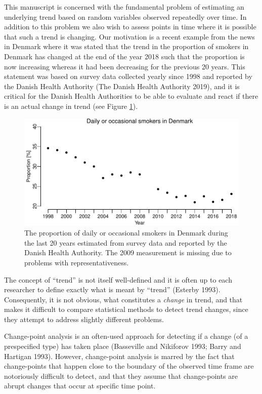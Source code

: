 \documentclass[11pt,]{article}
\theoremstyle{nonumberplain}
\begin{document}
This manuscript is concerned with the fundamental problem of estimating
an underlying trend based on random variables observed repeatedly over
time. In addition to this problem we also wish to assess points in time
where it is possible that such a trend is changing. Our motivation is a
recent example from the news in Denmark where it was stated that the
trend in the proportion of smokers in Denmark has changed at the end of
the year 2018 such that the proportion is now increasing whereas it had
been decreasing for the previous 20 years. This statement was based on
survey data collected yearly since 1998 and reported by the Danish
Health Authority (The Danish Health Authority 2019), and it is critical
for the Danish Health Authorities to be able to evaluate and react if
there is an actual change in trend (see Figure \ref{fig:rawDataPlot}).

\begin{figure}[htb]
\center\includegraphics{rawDataPlot}
\caption{The proportion of daily or occasional smokers in Denmark during the last 20 years estimated from survey data and reported by the Danish Health Authority. The 2009 measurement is missing due to problems with representativeness.}
\label{fig:rawDataPlot}
\end{figure}

The concept of ``trend'' is not itself well-defined and it is often up
to each researcher to define exactly what is meant by ``trend'' (Esterby
1993). Consequently, it is not obvious, what constitutes a \emph{change}
in trend, and that makes it difficult to compare statistical methods to
detect trend changes, since they attempt to address slightly different
problems.

Change-point analysis is an often-used approach for detecting if a
change (of a prespecified type) has taken place (Basseville and
Nikiforov 1993; Barry and Hartigan 1993). However, change-point analysis
is marred by the fact that change-points that happen close to the
boundary of the observed time frame are notoriously difficult to detect,
and that they assume that change-points are abrupt changes that occur at
specific time point.
\end{document}
